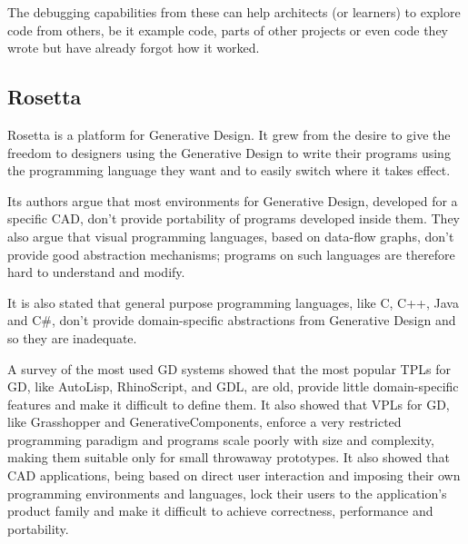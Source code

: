 \documentclass{./llncs2e/llncs}
\begin{document}
	The debugging capabilities from these can help architects (or learners) to explore code from others, be it example code, parts of other projects or even code they wrote but have already forgot how it worked.


\subsection{Rosetta}
	Rosetta is a platform for Generative Design. It grew from the desire to give the freedom to designers using the Generative Design to write their programs using the programming language they want and to easily switch where it takes effect.

	Its authors argue that most environments for Generative Design, developed for a specific CAD, don't provide portability of programs developed inside them. They also argue that visual programming languages, based on data-flow graphs, don't provide good abstraction mechanisms; programs on such languages are therefore hard to understand and modify.

	It is also stated that general purpose programming languages, like C, C++, Java and C\#, don't provide domain-specific abstractions from Generative Design and so they are inadequate.

	A survey of the most used GD systems showed that the most popular TPLs for GD, like AutoLisp, RhinoScript, and GDL, are old, provide little domain-specific features and make it difficult to define them. It also showed that VPLs for GD, like Grasshopper and GenerativeComponents, enforce a very restricted programming paradigm and programs scale poorly with size and complexity, making them suitable only for small throwaway prototypes. It also showed that CAD applications, being based on direct user interaction and imposing their own programming environments and languages, lock their users to the application's product family and make it difficult to achieve correctness, performance and portability.
\end{document}
